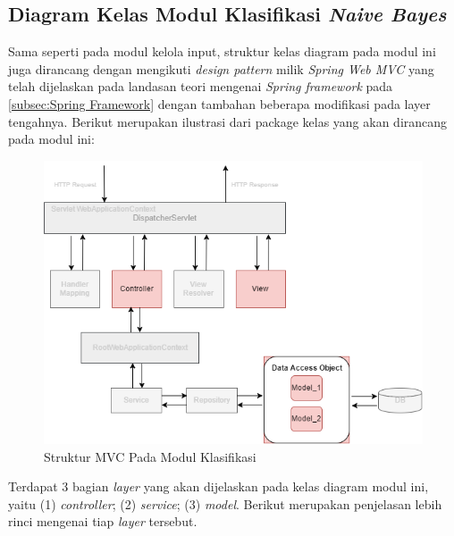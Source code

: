 
\subsection{Diagram Kelas Modul Klasifikasi \textit{Naive Bayes}}

Sama seperti pada modul kelola input, struktur kelas diagram pada modul ini juga dirancang dengan mengikuti \textit{design pattern} milik \textit{Spring Web MVC} yang telah dijelaskan pada landasan teori mengenai \textit{Spring framework} pada \ref{subsec:Spring Framework} dengan tambahan beberapa modifikasi pada layer tengahnya. Berikut merupakan ilustrasi dari package kelas yang akan dirancang pada modul ini:
\begin{figure}[H]
	\centering
	\includegraphics[scale=0.7]{ClassDiagramLengkap/springmvc_rev1}
	\caption[Struktur MVC Pada Modul Klasifikasi]{Struktur MVC Pada Modul Klasifikasi}
	\label{fig:Struktur MVC Pada Modul Klasifikasi}
\end{figure}

Terdapat 3 bagian \textit{layer} yang akan dijelaskan pada kelas diagram modul ini, yaitu (1) \textit{controller}; (2) \textit{service}; (3) \textit{model}. Berikut merupakan penjelasan lebih rinci mengenai tiap \textit{layer} tersebut.

